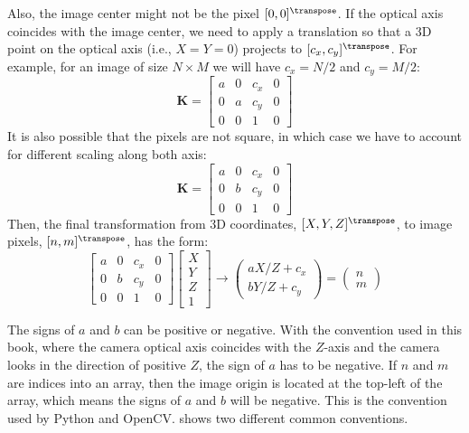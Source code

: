 Also, the image center might not be the pixel $[0,0]^\transpose$. If the optical axis coincides with the image center, we need to apply a translation so that a 3D point on the optical axis (i.e., $X=Y=0$) projects to $[c_x, c_y]^\transpose$. For example, for an image of size $N \times M$ we will have $c_x=N/2$ and $c_y=M/2$:
\begin{equation}
    \mathbf{K} =             
    \begin{bmatrix}
    a & 0 & c_x & 0 \\
    0 & a & c_y & 0 \\
    0 & 0 & 1 & 0
    \end{bmatrix}
    \label{eq:intrinsic}
\end{equation}
It is also possible that the pixels are not square, in which case we have to account for different scaling along both axis:
\begin{equation}
    \mathbf{K} =             
    \begin{bmatrix}
    a & 0 & c_x & 0 \\
    0 & b & c_y & 0 \\
    0 & 0 & 1 & 0
    \end{bmatrix}
    \label{eq:intrinsic}
\end{equation}
Then, the final transformation from 3D coordinates, $[X,Y,Z]^\transpose$, to image pixels, $[n,m]^\transpose$, has the form: 
\begin{equation}
    \begin{bmatrix}
    a & 0 & c_x & 0 \\
    0 & b & c_y & 0 \\
    0 & 0 & 1 & 0
    \end{bmatrix}
    \begin{bmatrix}
    X \\
    Y \\
    Z \\
    1
    \end{bmatrix}
    \rightarrow
    \begin{pmatrix}
    a X/Z+c_x \\
    b Y/Z+c_y
    \end{pmatrix}
    =
    \begin{pmatrix}
    n \\
    m
    \end{pmatrix}
    \label{eq:intrinsic}
\end{equation}




The signs of $a$ and $b$ can be positive or negative. With the convention used in this book, where the camera optical axis coincides with the $Z$-axis and the camera looks in the direction of positive $Z$, the sign of $a$ has to be negative. If $n$ and $m$ are indices into an array, then the image origin is located at the top-left of the array, which means the signs of $a$ and $b$ will be negative. This is the convention used by Python and OpenCV. \Fig{\ref{fig:conventions}} shows two different common conventions. 


